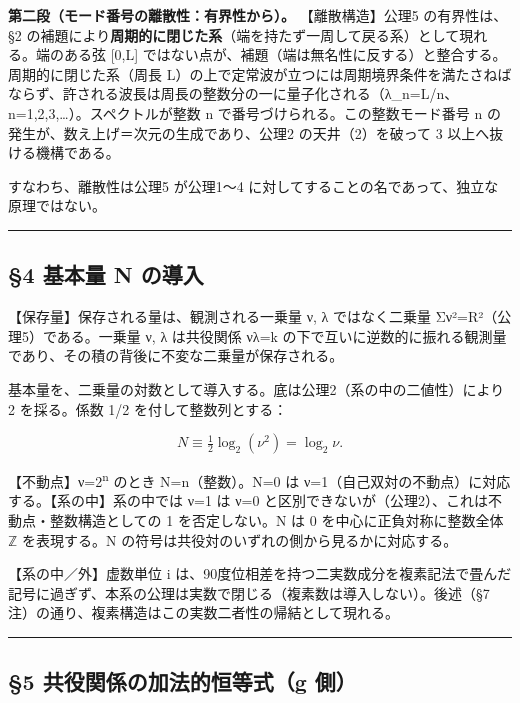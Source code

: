 \documentclass[11pt]{ltjsarticle}
\begin{document}
\textbf{第二段（モード番号の離散性：有界性から）。} 【離散構造】公理5
の有界性は、§2
の補題により\textbf{周期的に閉じた系}（端を持たず一周して戻る系）として現れる。端のある弦
{[}0,L{]}
ではない点が、補題（端は無名性に反する）と整合する。周期的に閉じた系（周長
L）の上で定常波が立つには周期境界条件を満たさねばならず、許される波長は周長の整数分の一に量子化される（λ\_n=L/n、n=1,2,3,\ldots）。スペクトルが整数
n で番号づけられる。この整数モード番号 n
の発生が、数え上げ＝次元の生成であり、公理2 の天井（2）を破って 3
以上へ抜ける機構である。

すなわち、離散性は公理5 が公理1〜4
に対してすることの名であって、独立な原理ではない。

\begin{center}\rule{0.5\linewidth}{0.5pt}\end{center}

\subsection{§4 基本量 N
の導入}\label{ux57faux672cux91cf-n-ux306eux5c0eux5165}

【保存量】保存される量は、観測される一乗量 ν, λ ではなく二乗量
Σν²=R²（公理5）である。一乗量 ν, λ は共役関係 νλ=k
の下で互いに逆数的に振れる観測量であり、その積の背後に不変な二乗量が保存される。

基本量を、二乗量の対数として導入する。底は公理2（系の中の二値性）により
2 を採る。係数 1/2 を付して整数列とする：

\[N \equiv \tfrac{1}{2}\log_2(\nu^2) = \log_2\nu .\]

【不動点】ν=2\textsuperscript{n} のとき N=n（整数）。N=0 は
ν=1（自己双対の不動点）に対応する。【系の中】系の中では ν=1 は ν=0
と区別できないが（公理2）、これは不動点・整数構造としての 1
を否定しない。N は 0 を中心に正負対称に整数全体 $\mathbb{Z}$ を表現する。N
の符号は共役対のいずれの側から見るかに対応する。

【系の中／外】虚数単位 i
は、90度位相差を持つ二実数成分を複素記法で畳んだ記号に過ぎず、本系の公理は実数で閉じる（複素数は導入しない）。後述（§7
注）の通り、複素構造はこの実数二者性の帰結として現れる。

\begin{center}\rule{0.5\linewidth}{0.5pt}\end{center}

\subsection{§5 共役関係の加法的恒等式（g
側）}\label{ux5171ux5f79ux95a2ux4fc2ux306eux52a0ux6cd5ux7684ux6052ux7b49ux5f0fg-ux5074}
\end{document}
